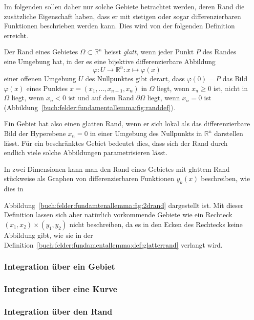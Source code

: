 Im folgenden sollen daher nur solche Gebiete betrachtet werden,
deren Rand die zusätzliche Eigenschaft haben, dass er mit stetigen
oder sogar differenzierbaren Funktionen beschrieben werden kann.
Dies wird von der folgenden Definition erreicht.

\begin{definition}
\label{buch:felder:fundamentallemma:def:glatterrand}
Der Rand eines Gebietes $\Omega\subset\mathbb{R}^n$ heisst {\em glatt},
wenn jeder Punkt $P$ des Randes eine Umgebung hat, in der es eine bijektive
differenzierbare Abbildung
\[
\varphi
\colon
U\to \mathbb{R}^n 
:
x\mapsto \varphi(x)
\]
einer offenen Umgebung $U$ des Nullpunktes gibt derart, dass $\varphi(0)=P$
das Bild $\varphi(x)$ eines Punktes $x=(x_1,\dots,x_{n-1},x_n)$ in $\Omega$
liegt, wenn $x_n\ge 0$ ist, nicht in $\Omega$ liegt, wenn $x_n<0$ ist und auf
dem Rand $\partial\Omega$ liegt, wenn $x_n=0$ ist
(Abbildung~\ref{buch:felder:fundamentallemma:fig:randdef}).

\end{definition}

Ein Gebiet hat also einen glatten Rand, wenn er sich lokal als das
differenzierbare Bild der Hyperebene $x_n=0$ in einer Umgebung des
Nullpunkts in $\mathbb{R}^n$ darstellen lässt.
Für ein beschränktes Gebiet bedeutet dies, dass sich der Rand durch
endlich viele solche Abbildungen parametrisieren lässt.

In zwei Dimensionen kann man den Rand eines Gebietes mit
glattem Rand stückweise als Graphen von differenzierbaren Funktionen
$y_k(x)$ beschreiben, wie dies in

Abbildung~\ref{buch:felder:fundamtenallemma:fig:2drand}
dargestellt ist.
Mit dieser Definition lassen sich aber natürlich vorkommende Gebiete
wie ein Rechteck $(x_1,x_2)\times(y_1,y_2)$ nicht beschreiben, da
es in den Ecken des Rechtecks keine Abbildung gibt, wie sie in der
Definition~\ref{buch:felder:fundamentallemma:def:glatterrand}
verlangt wird.


%
%
\subsubsection{Integration über ein Gebiet}

%
%
\subsubsection{Integration über eine Kurve}

%
%
\subsubsection{Integration über den Rand}

